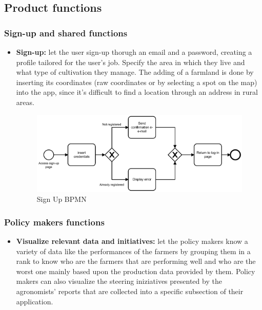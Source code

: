 \documentclass[table, 12pt]{article}
\begin{document}
\subsection{Product functions}
\label{product_functions}
\subsubsection{Sign-up and shared functions}
\begin{itemize}
    \item \textbf{Sign-up:} let the user sign-up thorugh an email and a password, creating a profile tailored for the user's job. Specify the area in which they live and what type of cultivation they manage. The adding of a farmland is done by inserting its coordinates (raw coordinates or by selecting a spot on the map) into the app, since it's difficult to find a location through an address in rural areas.
    \begin{center}
        \begin{figure}[!h]
            \includegraphics[width=\textwidth]{assets/BPMN/SignUpBpmn}
            \caption{Sign Up BPMN}
            \label{fig: singup}
        \end{figure}
    \end{center}
\end{itemize}
\subsubsection{Policy makers functions}
\begin{itemize}                                 
    \item \textbf{Visualize relevant data and initiatives: }let the policy makers know a variety of data like the performances of the farmers by grouping them in a rank to know who are the farmers that are performing well and who are the worst one mainly based upon the production data provided by them.
    Policy makers can also visualize the steering iniziatives presented by the agronomists' reports that are collected into a specific subsection of their application.
\end{itemize}
\end{document}
